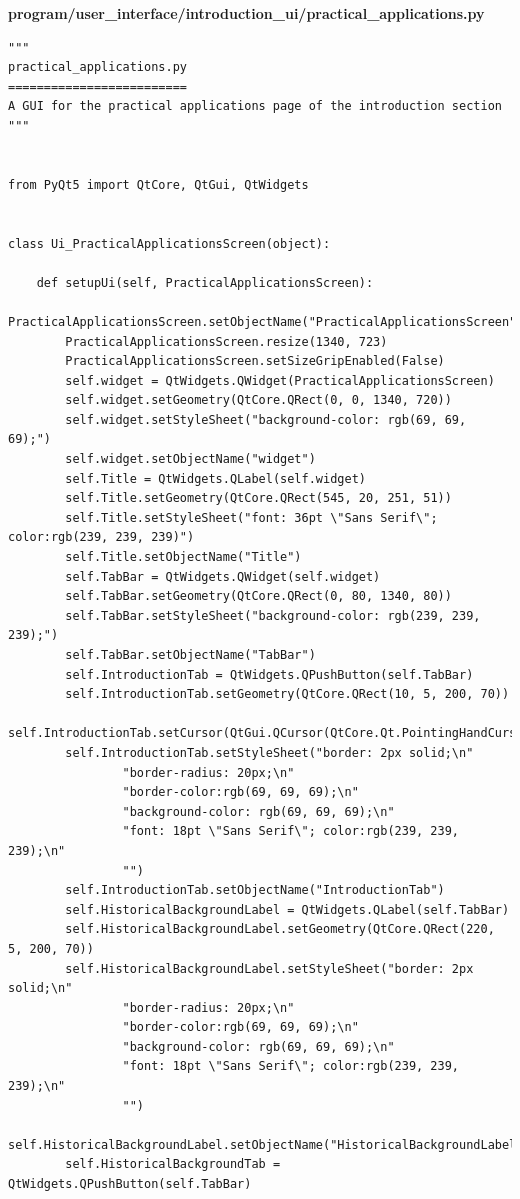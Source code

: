 \documentclass[12pt]{article}
\begin{document}
\textbf{program/user\_interface/introduction\_ui/practical\_applications.py}
\begin{lstlisting}
"""
practical_applications.py
=========================
A GUI for the practical applications page of the introduction section
"""


from PyQt5 import QtCore, QtGui, QtWidgets


class Ui_PracticalApplicationsScreen(object):

    def setupUi(self, PracticalApplicationsScreen):
        PracticalApplicationsScreen.setObjectName("PracticalApplicationsScreen")
        PracticalApplicationsScreen.resize(1340, 723)
        PracticalApplicationsScreen.setSizeGripEnabled(False)
        self.widget = QtWidgets.QWidget(PracticalApplicationsScreen)
        self.widget.setGeometry(QtCore.QRect(0, 0, 1340, 720))
        self.widget.setStyleSheet("background-color: rgb(69, 69, 69);")
        self.widget.setObjectName("widget")
        self.Title = QtWidgets.QLabel(self.widget)
        self.Title.setGeometry(QtCore.QRect(545, 20, 251, 51))
        self.Title.setStyleSheet("font: 36pt \"Sans Serif\"; color:rgb(239, 239, 239)")
        self.Title.setObjectName("Title")
        self.TabBar = QtWidgets.QWidget(self.widget)
        self.TabBar.setGeometry(QtCore.QRect(0, 80, 1340, 80))
        self.TabBar.setStyleSheet("background-color: rgb(239, 239, 239);")
        self.TabBar.setObjectName("TabBar")
        self.IntroductionTab = QtWidgets.QPushButton(self.TabBar)
        self.IntroductionTab.setGeometry(QtCore.QRect(10, 5, 200, 70))
        self.IntroductionTab.setCursor(QtGui.QCursor(QtCore.Qt.PointingHandCursor))
        self.IntroductionTab.setStyleSheet("border: 2px solid;\n"
                "border-radius: 20px;\n"
                "border-color:rgb(69, 69, 69);\n"
                "background-color: rgb(69, 69, 69);\n"
                "font: 18pt \"Sans Serif\"; color:rgb(239, 239, 239);\n"
                "")
        self.IntroductionTab.setObjectName("IntroductionTab")
        self.HistoricalBackgroundLabel = QtWidgets.QLabel(self.TabBar)
        self.HistoricalBackgroundLabel.setGeometry(QtCore.QRect(220, 5, 200, 70))
        self.HistoricalBackgroundLabel.setStyleSheet("border: 2px solid;\n"
                "border-radius: 20px;\n"
                "border-color:rgb(69, 69, 69);\n"
                "background-color: rgb(69, 69, 69);\n"
                "font: 18pt \"Sans Serif\"; color:rgb(239, 239, 239);\n"
                "")
        self.HistoricalBackgroundLabel.setObjectName("HistoricalBackgroundLabel")
        self.HistoricalBackgroundTab = QtWidgets.QPushButton(self.TabBar)

\end{lstlisting}
\end{document}
